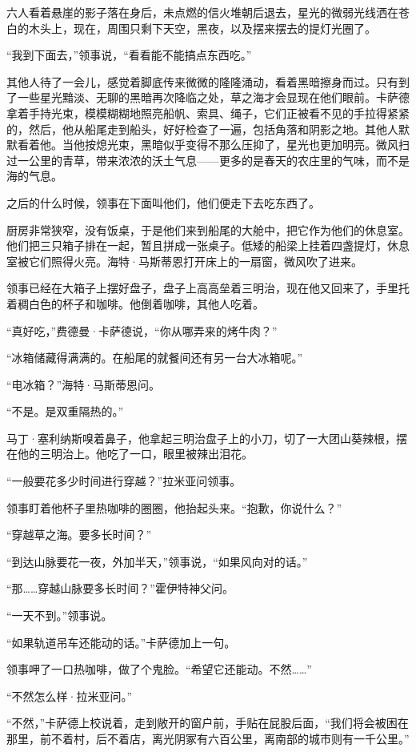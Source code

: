 \documentclass[AutoFakeBold=true]{book}
\begin{document}
六人看着悬崖的影子落在身后，未点燃的信火堆朝后退去，星光的微弱光线洒在苍白的木头上，现在，周围只剩下天空，黑夜，以及摆来摆去的提灯光圈了。

``我到下面去，''领事说，``看看能不能搞点东西吃。''

其他人待了一会儿，感觉着脚底传来微微的隆隆涌动，看着黑暗擦身而过。只有到了一些星光黯淡、无聊的黑暗再次降临之处，草之海才会显现在他们眼前。卡萨德拿着手持光束，模模糊糊地照亮船帆、索具、绳子，它们正被看不见的手拉得紧紧的，然后，他从船尾走到船头，好好检查了一遍，包括角落和阴影之地。其他人默默看着他。当他按熄光束，黑暗似乎变得不那么压抑了，星光也更加明亮。微风扫过一公里的青草，带来浓浓的沃土气息——更多的是春天的农庄里的气味，而不是海的气息。

之后的什么时候，领事在下面叫他们，他们便走下去吃东西了。

厨房非常狭窄，没有饭桌，于是他们来到船尾的大舱中，把它作为他们的休息室。他们把三只箱子排在一起，暂且拼成一张桌子。低矮的船梁上挂着四盏提灯，休息室被它们照得火亮。海特·马斯蒂恩打开床上的一扇窗，微风吹了进来。

领事已经在大箱子上摆好盘子，盘子上高高垒着三明治，现在他又回来了，手里托着稠白色的杯子和咖啡。他倒着咖啡，其他人吃着。

``真好吃，''费德曼·卡萨德说，``你从哪弄来的烤牛肉？''

``冰箱储藏得满满的。在船尾的就餐间还有另一台大冰箱呢。''

``电冰箱？''海特·马斯蒂恩问。

``不是。是双重隔热的。''

马丁·塞利纳斯嗅着鼻子，他拿起三明治盘子上的小刀，切了一大团山葵辣根，摆在他的三明治上。他吃了一口，眼里被辣出泪花。

``一般要花多少时间进行穿越？''拉米亚问领事。

领事盯着他杯子里热咖啡的圈圈，他抬起头来。``抱歉，你说什么？''

``穿越草之海。要多长时间？''

``到达山脉要花一夜，外加半天，''领事说，``如果风向对的话。''

``那……穿越山脉要多长时间？''霍伊特神父问。

``一天不到。''领事说。

``如果轨道吊车还能动的话。''卡萨德加上一句。

领事呷了一口热咖啡，做了个鬼脸。``希望它还能动。不然……''

``不然怎么样·拉米亚问。''

``不然，''卡萨德上校说着，走到敞开的窗户前，手贴在屁股后面，``我们将会被困在那里，前不着村，后不着店，离光阴冢有六百公里，离南部的城市则有一千公里。''
\end{document}
